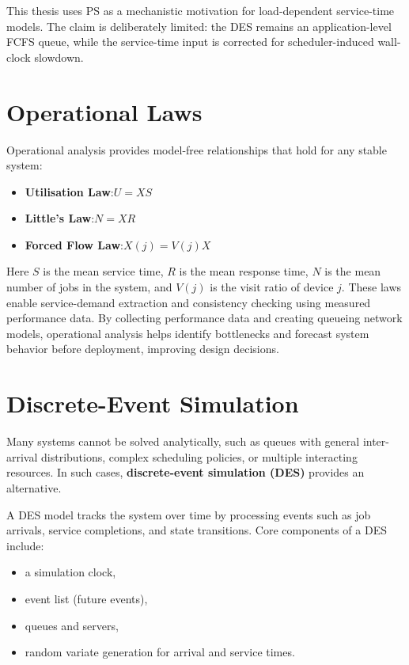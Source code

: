 This thesis uses PS as a mechanistic motivation for load-dependent service-time models. The claim is deliberately limited: the DES remains an application-level FCFS queue, while the service-time input is corrected for scheduler-induced wall-clock slowdown.

\section{Operational Laws}

Operational analysis provides model-free relationships that hold for any
stable system:

\begin{itemize}
    \item \textbf{Utilisation Law}:\quad $U = X S$
    \item \textbf{Little's Law}:\quad $N = X R$
    \item \textbf{Forced Flow Law}:\quad $X(j) = V(j) X$
\end{itemize}

Here $S$ is the mean service time, $R$ is the mean response time, $N$ is the mean
number of jobs in the system, and $V(j)$ is the visit ratio of device $j$.
These laws enable service-demand extraction and consistency checking
using measured performance data. By collecting performance data and creating queueing network models, operational analysis helps identify bottlenecks and forecast system behavior before deployment, improving design decisions.

\section{Discrete-Event Simulation}

Many systems cannot be solved analytically, such as queues with general
inter-arrival distributions, complex scheduling policies, or multiple
interacting resources. In such cases, \textbf{discrete-event simulation
(DES)} provides an alternative.

A DES model tracks the system over time by processing events such as job
arrivals, service completions, and state transitions. Core components of
a DES include:

\begin{itemize}
    \item a simulation clock,
    \item event list (future events),
    \item queues and servers,
    \item random variate generation for arrival and service times.
\end{itemize}

